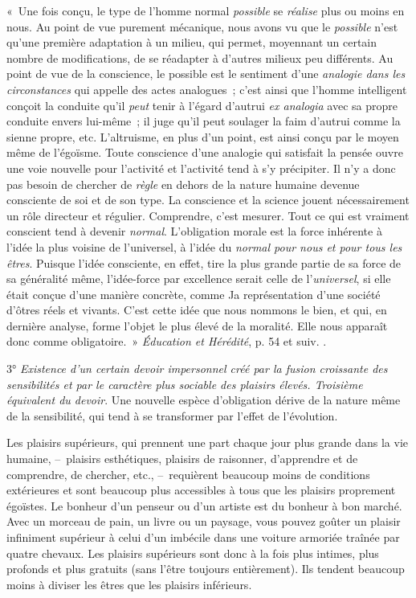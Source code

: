 \documentclass[french,twoside]{book} %
\begin{document}
{ « Une fois conçu, le type de l’homme normal \emph{possible} se \emph{réalise} plus ou moins en nous. Au point de vue purement mécanique, nous avons vu que le \emph{possible} n’est qu’une première adaptation à un milieu, qui permet, moyennant un certain nombre de modifications, de se réadapter à d’autres milieux peu différents. Au point de vue de la conscience, le possible est le sentiment d’une \emph{analogie dans les circonstances} qui appelle des actes analogues ; c’est ainsi que l’homme intelligent conçoit la conduite qu’il \emph{peut} tenir à l’égard d’autrui \emph{ex analogia} avec sa propre conduite envers lui-même ; il juge qu’il peut soulager la faim d’autrui comme la sienne propre, etc. L’altruisme, en plus d’un point, est ainsi conçu par le moyen même de l’égoïsme. Toute conscience d’une analogie qui satisfait la pensée ouvre une voie nouvelle pour l’activité et l’activité tend à s’y précipiter. Il n’y a donc pas besoin de chercher de \emph{règle} en dehors de la nature humaine devenue consciente de soi et de son type. La conscience et la science jouent nécessairement un rôle directeur et régulier. Comprendre, c’est mesurer. Tout ce qui est vraiment conscient tend à devenir \emph{normal}. L’obligation morale est la force inhérente à l’idée la plus voisine de l’universel, à l’idée du \emph{normal pour nous et pour tous les êtres}. Puisque l’idée consciente, en effet, tire la plus grande partie de sa force de sa généralité même, l’idée-force par excellence serait celle de l’\emph{universel}, si elle était conçue d’une manière concrète, comme Ja représentation d’une société d’ôtres réels et vivants. C’est cette idée que nous nommons le bien, et qui, en dernière analyse, forme l’objet le plus élevé de la moralité. Elle nous apparaît donc comme obligatoire. » \emph{Éducation et Hérédité}, p. 54 et suiv.
}.\par
3° \emph{Existence d’un certain devoir impersonnel créé par la fusion croissante des sensibilités et par le caractère plus sociable des plaisirs élevés. Troisième équivalent du devoir}. Une nouvelle espèce d’obligation dérive de la nature même de la sensibilité, qui tend à se transformer par l’effet de l’évolution.\par
Les plaisirs supérieurs, qui prennent une part chaque jour plus grande dans la vie humaine, – plaisirs esthétiques, plaisirs de raisonner, d’apprendre et de comprendre, de chercher, etc., – requièrent beaucoup moins de conditions extérieures et sont beaucoup plus accessibles à tous que les plaisirs proprement égoïstes. Le bonheur d’un penseur ou d’un artiste est du bonheur à bon marché. Avec un morceau de pain, un livre ou un paysage, vous pouvez goûter un plaisir infiniment supérieur à celui d’un imbécile dans une voiture armoriée traînée par quatre chevaux. Les plaisirs supérieurs sont donc à la fois plus intimes, plus profonds et plus gratuits (sans l’être toujours entièrement). Ils tendent beaucoup moins à diviser les êtres que les plaisirs inférieurs.\par
\end{document}
